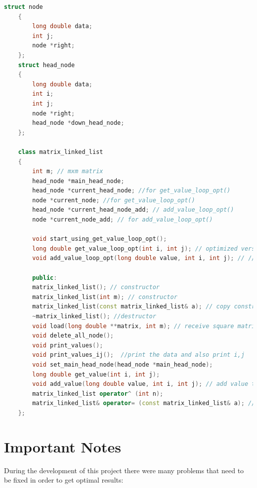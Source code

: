 \documentclass[12pt]{article}
\begin{document}
    
    \begin{lstlisting}[language=c++, caption={matrix\_linked\_list class}, label={list:mll}]    
    struct node
    {
        long double data;
        int j;
        node *right;
    };
    struct head_node
    {
        long double data;
        int i;
        int j;
        node *right;
        head_node *down_head_node;
    };
    
    class matrix_linked_list
    {
        int m; // mxm matrix
        head_node *main_head_node;
        head_node *current_head_node; //for get_value_loop_opt()
        node *current_node; //for get_value_loop_opt()
        head_node *current_head_node_add; // add_value_loop_opt()
        node *current_node_add; // for add_value_loop_opt()
        
        void start_using_get_value_loop_opt();
        long double get_value_loop_opt(int i, int j); // optimized version of get_value (make the loop faster using temp node address)
        void add_value_loop_opt(long double value, int i, int j); // // optimized version of add_value (make the loop faster using temp node address)
        
        public:
        matrix_linked_list(); // constructor 
        matrix_linked_list(int m); // constructor 
        matrix_linked_list(const matrix_linked_list& a); // copy constructor for return
        ~matrix_linked_list(); //destructor
        void load(long double **matrix, int m); // receive square matrix and size mxm
        void delete_all_node();
        void print_values();
        void print_values_ij();  //print the data and also print i,j 
        void set_main_head_node(head_node *main_head_node);
        long double get_value(int i, int j);
        void add_value(long double value, int i, int j); // add value to the existing i,j if not -> create new node
        matrix_linked_list operator^ (int n);
        matrix_linked_list& operator= (const matrix_linked_list& a); // assigment
    };
\end{lstlisting}    



\section{Important Notes}

During the development of this project there were many problems that need to be fixed in order to get optimal results:
\end{document}
